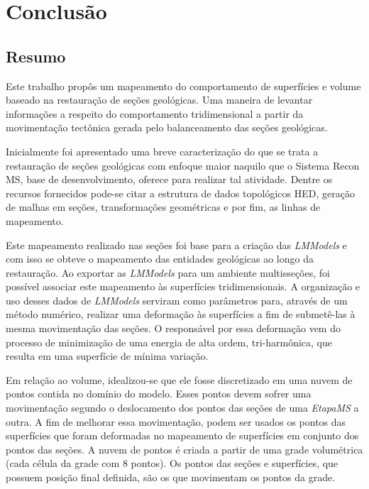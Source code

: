 
\chapter{Conclusão}

\section{Resumo}

Este trabalho propôs um mapeamento do comportamento de superfícies e volume baseado na restauração de seções geológicas. Uma maneira de levantar informações a respeito do comportamento tridimensional a partir da movimentação tectônica gerada pelo balanceamento das seções geológicas.

Inicialmente foi apresentado uma breve caracterização do que se trata a restauração de seções geológicas com enfoque maior naquilo que o Sistema Recon MS, base de desenvolvimento, oferece para realizar tal atividade. Dentre os recursos fornecidos pode-se citar a estrutura de dados topológicos HED, geração de malhas em seções, transformações geométricas e por fim, as linhas de mapeamento.

Este mapeamento realizado nas seções foi base para a criação das \emph{LMModels} e com isso se obteve o mapeamento das entidades geológicas ao longo da restauração. Ao exportar as \emph{LMModels} para um ambiente multisseções, foi possível associar este mapeamento às superfícies tridimensionais. A organização e uso desses dados de \emph{LMModels} serviram como parâmetros para, através de um método numérico, realizar uma deformação às superfícies a fim de submetê-las à mesma movimentação das seções. O responsável por essa deformação vem do processo de minimização de uma energia de alta ordem, tri-harmônica, que resulta em uma superfície de mínima variação.

Em relação ao volume, idealizou-se que ele fosse discretizado em uma nuvem de pontos contida no domínio do modelo. Esses pontos devem sofrer uma movimentação segundo o deslocamento dos pontos das seções de uma \emph{EtapaMS} a outra. A fim de melhorar essa movimentação, podem ser usados os pontos das superfícies que foram deformadas no mapeamento de superfícies em conjunto dos pontos das seções. A nuvem de pontos é criada a partir de uma grade volumétrica (cada célula da grade com 8 pontos). Os pontos das seções e superfícies, que possuem posição final definida, são os que movimentam os pontos da grade. 

